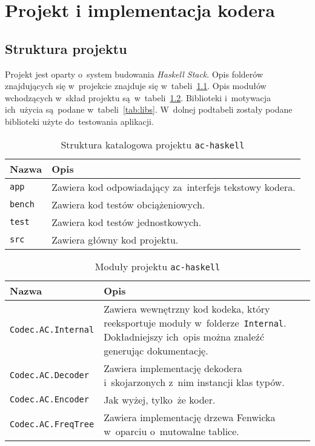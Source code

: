 \documentclass[../../praca.tex]{subfiles}
\begin{document}
\chapter{Projekt i implementacja kodera}

\section{Struktura projektu}

Projekt jest oparty o~system budowania \emph{Haskell Stack}.
Opis folderów znajdujących się w~projekcie znajduje się w~tabeli~\ref{tab:directories}.
Opis modułów wchodzących w~skład projektu są~w~tabeli~\ref{tab:modules}.
Biblioteki i~motywacja ich~użycia są~podane w~tabeli~\ref{tab:libs}.
W~dolnej podtabeli zostały podane biblioteki użyte do~testowania
aplikacji.

\begin{table}
  \centering
  \begin{tabular}{|l|p{8cm}|}
    \hline
    Nazwa & Opis \\ \hline
    \texttt{app}                & Zawiera kod odpowiadający za~interfejs tekstowy kodera. \\ \hline
    \texttt{bench}              & Zawiera kod testów obciążeniowych. \\ \hline
    \texttt{test}               & Zawiera kod testów jednostkowych. \\ \hline
    \texttt{src}                & Zawiera główny kod projektu. \\ \hline 
  \end{tabular}
  \caption{Struktura katalogowa projektu \texttt{ac-haskell}}
  \label{tab:directories}
\end{table}

\begin{table}
  \centering
  \begin{tabular}{|l|p{8cm}|}
    \hline 
    Nazwa & Opis \\ \hline
    \texttt{Codec.AC.Internal}  & Zawiera wewnętrzny kod kodeka, który reeksportuje
                                  moduły w~folderze~\texttt{Internal}. Dokładniejszy
                                  ich~opis można znaleźć generując dokumentację.\\ \hline
    \texttt{Codec.AC.Decoder}   & Zawiera implementację dekodera 
                                  i~skojarzonych z~nim instancji klas typów. \\ \hline
    \texttt{Codec.AC.Encoder}   & Jak wyżej, tylko~że koder. \\ \hline
    \texttt{Codec.AC.FreqTree}  & Zawiera implementację drzewa Fenwicka w~oparciu 
                                  o~mutowalne tablice. \\ \hline
  \end{tabular}
  \caption{Moduły projektu \texttt{ac-haskell}}
  \label{tab:modules}
\end{table}
\end{document}
